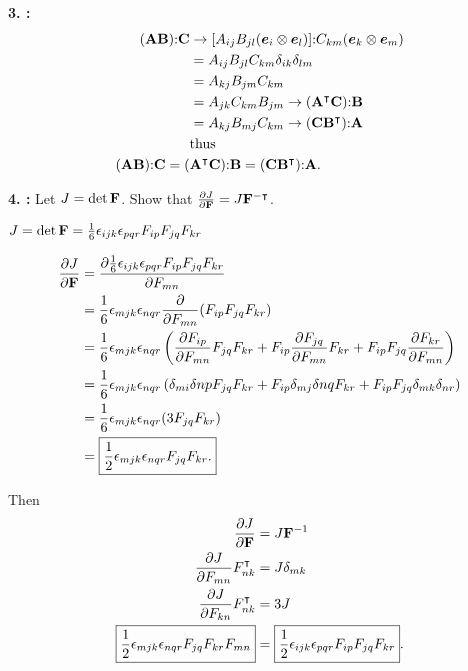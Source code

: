 \textbf{3. :}
\begin{align*}
    (\mathbf{A} \mathbf{B}) \mathbf{:} \mathbf{C} &\rightarrow [ A_{ij} B_{jl} (\bm{e}_i \otimes \bm{e}_l)] \mathbf{:} C_{km} (\bm{e}_k \otimes \bm{e}_m)\\
    &= A_{ij} B_{jl} C_{km} \delta_{ik} \delta_{lm}\\
    &= A_{kj} B_{jm} C_{km} \\
    &= A_{jk} C_{km} B_{jm} \rightarrow (\mathbf{A}^\intercal \mathbf{C}) \mathbf{:} \mathbf{B}\\
    &= A_{kj} B_{mj} C_{km} \rightarrow (\mathbf{C} \mathbf{B}^\intercal) \mathbf{:} \mathbf{A}\\
    &\text{thus}\\
     (\mathbf{A} \mathbf{B}) \mathbf{:} \mathbf{C} = (&\mathbf{A}^\intercal \mathbf{C}) \mathbf{:} \mathbf{B} = (\mathbf{C} \mathbf{B}^\intercal) \mathbf{:} \mathbf{A}.
\end{align*}

\textbf{4. :}
Let $J = \det \mathbf{F}$. Show that $\frac{\partial J}{\partial \mathbf{F}} = J \mathbf{F}^{-\intercal}$.

$J = \det \mathbf{F} = \frac{1}{6} \epsilon_{ijk} \epsilon_{pqr} F_{ip} F_{jq} F_{kr}$

\begin{align*}
    \frac{\partial J}{\partial \mathbf{F}} &= \frac{\partial \frac{1}{6} \epsilon_{ijk} \epsilon_{pqr} F_{ip} F_{jq} F_{kr}}{\partial F_{mn}}\\
    &= \frac{1}{6} \epsilon_{mjk} \epsilon_{nqr} \frac{\partial}{\partial F_{mn}} (F_{ip} F_{jq} F_{kr})\\
    &= \frac{1}{6} \epsilon_{mjk} \epsilon_{nqr} \left( \frac{\partial F_{ip}}{\partial F_{mn}} F_{jq} F_{kr} + F_{ip}\frac{\partial F_{jq}}{\partial F_{mn}} F_{kr} + F_{ip} F_{jq} \frac{\partial F_{kr}}{\partial F_{mn}} \right)\\
    &= \frac{1}{6} \epsilon_{mjk} \epsilon_{nqr} \left( \delta_{mi} \delta{np} F_{jq} F_{kr} + F_{ip} \delta_{mj} \delta{nq} F_{kr} + F_{ip} F_{jq} \delta_{mk} \delta_{nr} \right)\\
    &= \frac{1}{6} \epsilon_{mjk} \epsilon_{nqr} (3 F_{jq} F_{kr})\\
    &= \boxed{\frac{1}{2} \epsilon_{mjk} \epsilon_{nqr} F_{jq} F_{kr}.}
\end{align*}

Then
\begin{align*}
    \frac{\partial J}{\partial \mathbf{F}} &= J \mathbf{F}^{-1}\\
    \frac{\partial J}{\partial F_{mn}} F_{nk}^\intercal &= J \delta_{mk}\\
    \frac{\partial J}{\partial F_{kn}} F_{nk}^\intercal &= 3J\\
    \boxed{\frac{1}{2} \epsilon_{mjk} \epsilon_{nqr} F_{jq} F_{kr} F_{mn}} &= \boxed{\frac{1}{2} \epsilon_{ijk} \epsilon_{pqr} F_{ip} F_{jq} F_{kr}}.
\end{align*}

